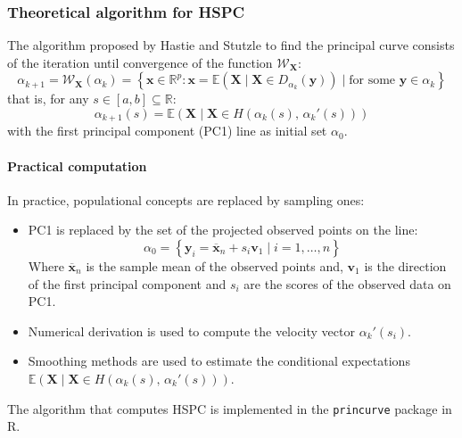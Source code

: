 \subsubsection{Theoretical algorithm for HSPC}

The algorithm proposed by Hastie and Stutzle to find the principal curve
consists of the iteration until convergence of the function $\mathcal W_{\boldsymbol X}$:
\begin{equation*}
	\alpha_{k+1} = \mathcal W_{\boldsymbol X}(\alpha_k) =
	\left\{
	\boldsymbol x \in \mathds{R}^p : \boldsymbol x = \mathds{E}(\boldsymbol X \mid \boldsymbol X \in
	D_{\alpha_k}(\boldsymbol y)) \mid \text{for some }\boldsymbol y \in \alpha_k
	\right\}
\end{equation*}
that is, for any $s \in [a, b] \subseteq \mathds{R}$:
\begin{equation*}
	\alpha_{k+1}(s) = \mathds{E}(\boldsymbol X \mid \boldsymbol X \in H(\alpha_k(s),\, \alpha_k'(s)))
\end{equation*}
with the first principal component (PC1) line as initial set $\alpha_0$.

\paragraph{Practical computation}
In practice, populational concepts are replaced by sampling ones:
\begin{itemize}
	\item PC1 is replaced by the set of the projected observed points on the line:
	      \begin{equation*}
		      \alpha_0 = \left\{
		      \boldsymbol y_i = \boldsymbol{\overline{x}}_n + s_i \boldsymbol{v}_1 \mid i = 1, \dots, n
		      \right\}
	      \end{equation*}
	      Where $\boldsymbol{\overline{x}}_n$ is the sample mean of the observed points and, $\boldsymbol{v}_1$
	      is the direction of the first principal component and $s_i$ are the scores of the observed
	      data on PC1.
	\item Numerical derivation is used to compute the velocity vector $\alpha_k'(s_i)$.
	\item Smoothing methods are used to estimate the conditional expectations
	      $\mathds{E}(\boldsymbol X \mid \boldsymbol X \in H(\alpha_k(s),\, \alpha_k'(s)))$.
\end{itemize}
\begin{note}
	The algorithm that computes HSPC is implemented in the \texttt{princurve} package in R.
\end{note}

